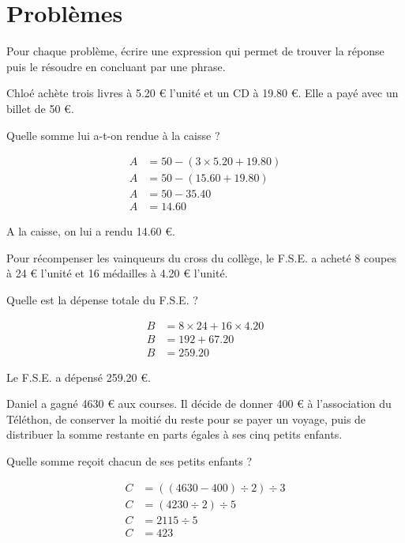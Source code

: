\section{Problèmes}

Pour chaque problème, écrire une expression qui permet de trouver la réponse puis le résoudre en concluant par une phrase.

\begin{questions}
	\question Chloé achète trois livres à \num{5.20} € l'unité et un CD à \num{19.80} €. Elle a payé avec un billet de 50 €. 
	
	Quelle somme lui a-t-on rendue à la caisse ?
	
	\begin{solution}
		\begin{align*}
			A &= 50 - (3 \times \num{5.20} + \num{19.80}) \\
			A &= 50 - (\num{15.60} + \num{19.80}) \\
			A &= 50 - \num{35.40} \\
			A &= \num{14.60}
		\end{align*}
		
		A la caisse, on lui a rendu \num{14.60} €.
	\end{solution}
	
	\question Pour récompenser les vainqueurs du cross du collège, le F.S.E. a acheté 8 coupes à 24 € l'unité et 16 médailles à \num{4.20} € l'unité.
	
	Quelle est la dépense totale du F.S.E. ?
	
	\begin{solution}
		\begin{align*}
			B &= 8 \times 24 + 16 \times \num{4.20} \\
			B &= 192 + \num{67.20} \\
			B &= \num{259.20}
		\end{align*}
		
		Le F.S.E. a dépensé \num{259.20} €.
	\end{solution}
	\question Daniel a gagné \num{4630} € aux courses. Il décide de donner 400 € à l'association du Téléthon, de conserver la moitié du reste pour se payer un voyage, puis de distribuer la somme restante en parts égales à ses cinq petits enfants.
	
	Quelle somme reçoit chacun de ses petits enfants ?
	
	\begin{solution}
		\begin{align*}
			C &= ((4630 - 400) \div 2) \div 3 \\
			C &= (4230 \div 2) \div 5 \\
			C &= 2115 \div 5 \\
			C &= 423 
		\end{align*}
		

\end{solution}
\end{questions}
